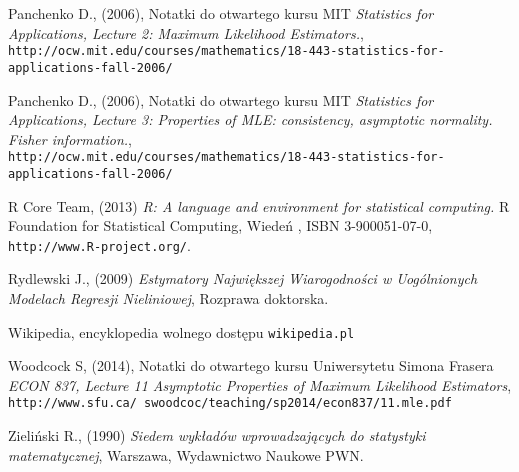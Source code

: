 \begin{thebibliography}{99}
 Panchenko D., (2006), Notatki do otwartego kursu MIT \textit{Statistics for Applications, Lecture 2: Maximum Likelihood Estimators.}, \\
\texttt{http://ocw.mit.edu/courses/mathematics/18-443-statistics-for-applications-fall-2006/}



 Panchenko D., (2006), Notatki do otwartego kursu MIT \textit{Statistics for Applications, Lecture 3: Properties of MLE: consistency, asymptotic normality. Fisher information.}, \\
\texttt{http://ocw.mit.edu/courses/mathematics/18-443-statistics-for-applications-fall-2006/}



 R Core Team, (2013) \textit{R: A language and environment for statistical computing.} R Foundation for Statistical Computing, Wiedeń , ISBN 3-900051-07-0, \texttt{http://www.R-project.org/}.

 Rydlewski J., (2009) \textit{Estymatory Największej Wiarogodności w Uogólnionych Modelach Regresji Nieliniowej}, Rozprawa doktorska.

 Wikipedia, encyklopedia wolnego dostępu \texttt{wikipedia.pl}
 
  Woodcock S, (2014), Notatki do otwartego kursu Uniwersytetu Simona Frasera \textit{ECON 837, Lecture 11 Asymptotic Properties of Maximum Likelihood Estimators}, \\ \texttt{http://www.sfu.ca/~swoodcoc/teaching/sp2014/econ837/11.mle.pdf}
 
 Zieliński R., (1990) \textit{Siedem wykładów wprowadzających do statystyki matematycznej}, Warszawa, Wydawnictwo Naukowe PWN.


\end{thebibliography}